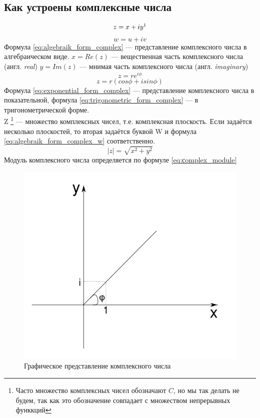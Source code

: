 \documentclass{article}
\begin{document}
        \subsection{Как устроены комплексные числа}
            \begin{equation}\label{eq:algebraik_form_complex}
                z=x+iy\footnotemark
            \end{equation}
            \begin{equation}\label{eq:algebraik_form_complex_w}
                w=u+iv
            \end{equation}
            Формула \ref{eq:algebraik_form_complex} --- представление комплексного числа в алгебраическом виде. $x=Re(z)$ --- вещественная часть комплексного числа (англ. \textit{real}) $y=Im(z)$ --- мнимая часть комплексного числа (англ. \textit{imaginary})\\
            \begin{equation}\label{eq:exponential_form_complex}
                z=re^{i\phi}
            \end{equation}
            \begin{equation}\label{eq:trigonometric_form_complex}
                z=r(cos\phi+i sin\phi)
            \end{equation}
          Формула \ref{eq:exponential_form_complex} --- представление комплексного числа в показательной, формула         \ref{eq:trigonometric_form_complex} --- в тригонометрической форме.\\
            Z \footnote{Часто множество комплексных чисел обозначают $C$, но мы так делать не будем, так как это обозначение совпадает с множеством непрерывных функкций} --- множество комплексных чисел, т.е. комплексная плоскость. Если задаётся несколько плоскостей, то вторая задаётся буквой W и формула \ref{eq:algebraik_form_complex_w} соответственно.
            \begin{equation}\label{eq:сomplex_module}
                |z|=\sqrt{x^2+y^2}
            \end{equation}
            Модуль комплексного числа определяется по формуле \ref{eq:сomplex_module}
            \begin{figure}[h]
                \includegraphics[width=0.6\linewidth]{complex_example}
                \caption{Графическое представление комплексного числа}
                \label{ris:complex_example}
            \end{figure}
\end{document}
